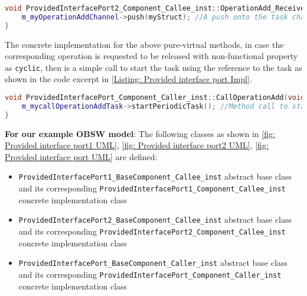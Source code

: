 \begin{Listing}
\begin{lstlisting}[language=C++]
void ProvidedInterfacePort2_Component_Callee_inst::OperationAdd_Receiver (General::OperationAddStruct_InterfaceB myStruct) {
	m_myOperationAddChannel->push(myStruct); //A push onto the task channel
}
\end{lstlisting}
\caption{Code excerpt from the generated code for operation \texttt{OperationAdd} access in \texttt{Provided\allowbreak Interface\allowbreak Port2} which is called asynchronously}
\label{Listing: Provided interface port2 Impl}
\end{Listing}

The concrete implementation for the above pure-virtual methods, in case the corresponding operation is requested to be released with non-functional property as \texttt{cyclic}, then is a simple call to start the task using the reference to the task as shown in the code excerpt in \cref{Listing: Provided interface port Impl}.

\begin{Listing}
\begin{lstlisting}[language=C++]
void ProvidedInterfacePort_Component_Caller_inst::CallOperationAdd(void) {
	m_mycallOperationAddTask->startPeriodicTask(); //Method call to start the task
}
\end{lstlisting}
\caption{Code excerpt from the generated code for operation \texttt{CallOperationAdd} in \texttt{Provided\allowbreak Interface\allowbreak Port} which has non-functional property set as \texttt{Cyclic}}
\label{Listing: Provided interface port Impl}
\end{Listing}

\textbf{For our example OBSW model}: The following classes as shown in \cref{fig: Provided interface port1 UML}, \cref{fig: Provided interface port2 UML}, \cref{fig: Provided interface port UML} are defined:
\begin{itemize}
\item \texttt{Provided\allowbreak Interface\allowbreak Port1\_\allowbreak Base\allowbreak Component\_\allowbreak Callee\_\allowbreak inst} abstract base class and its corresponding \texttt{Provided\allowbreak Interface\allowbreak Port1\_\allowbreak Component\_\allowbreak Callee\_\allowbreak inst} concrete implementation class
\item \texttt{Provided\allowbreak Interface\allowbreak Port2\_\allowbreak Base\allowbreak Component\_\allowbreak Callee\_\allowbreak inst} abstract base class and its corresponding \texttt{Provided\allowbreak Interface\allowbreak Port2\_\allowbreak Component\_\allowbreak Callee\_\allowbreak inst} concrete implementation class
\item \texttt{Provided\allowbreak Interface\allowbreak Port\_\allowbreak Base\allowbreak Component\_\allowbreak Caller\_\allowbreak inst} abstract base class and its corresponding \texttt{Provided\allowbreak Interface\allowbreak Port\_\allowbreak Component\_\allowbreak Caller\_\allowbreak inst} concrete implementation class 
\end{itemize} 

